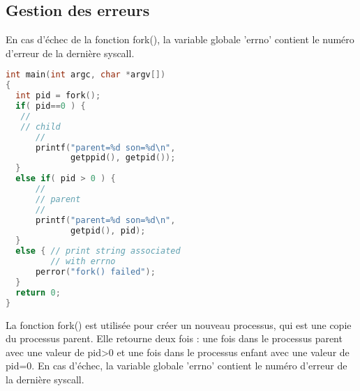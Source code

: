\documentclass[12pt]{report}
\begin{document}
 \subsection{Gestion des erreurs} 
 En cas d'échec de la fonction fork(), la variable globale 'errno' contient le numéro d'erreur de la dernière syscall.
\begin{lstlisting}[language=C] 
int main(int argc, char *argv[]) 
{ 
  int pid = fork(); 
  if( pid==0 ) { 
   // 
   // child 
      // 
      printf("parent=%d son=%d\n", 
             getppid(), getpid()); 
  } 
  else if( pid > 0 ) { 
      // 
      // parent 
      // 
      printf("parent=%d son=%d\n", 
             getpid(), pid); 
  } 
  else { // print string associated 
         // with errno   
      perror("fork() failed");  
  } 
  return 0; 
} 
\end{lstlisting}
\begin{tcolorbox}[colback=yellow!5, colframe=yellow!80!black, title={\faBookmark À retenir}] 
La fonction fork() est utilisée pour créer un nouveau processus, qui est une copie du processus parent. Elle retourne deux fois : une fois dans le processus parent avec une valeur de pid>0 et une fois dans le processus enfant avec une valeur de pid=0. En cas d'échec, la variable globale 'errno' contient le numéro d'erreur de la dernière syscall. 
\end{tcolorbox}
\end{document}
